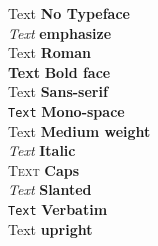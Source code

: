 \documentclass[20pt]{article}
\begin{document}
	
	\noindent
	\Huge
	Text           \textbf{No Typeface}		\\ %
	\emph{Text}    \textbf{emphasize}		\\ %
	\textrm{Text}  \textbf{Roman}	 		\\ %
	\textbf{Text}  \textbf{Bold face}		\\ %
	\textsf{Text}  \textbf{Sans-serif}		\\ %
	\texttt{Text}  \textbf{Mono-space}		\\ %
	\textmd{Text}  \textbf{Medium weight}	\\ %
	\textit{Text}  \textbf{Italic}			\\ %
	\textsc{Text}  \textbf{Caps}			\\ %
	\textsl{Text}  \textbf{Slanted}			\\ %
	\verb*|Text|   \textbf{Verbatim} 		\\ %
	\textup{Text}  \textbf{upright}			\\ %
	
	
\end{document}
